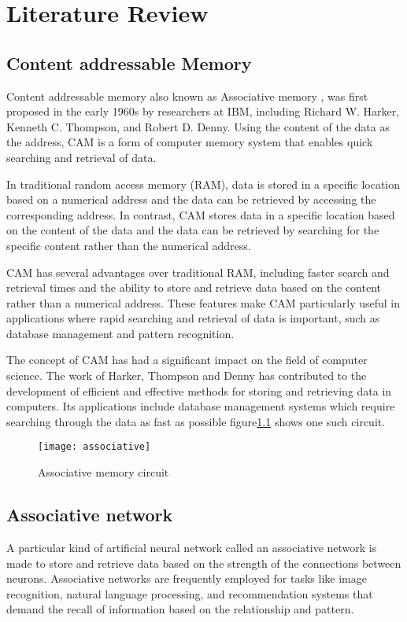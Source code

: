 \chapter{Literature Review}

\section{Content addressable Memory}
Content addressable memory also known as Associative memory , was first
proposed in the early 1960s by researchers at IBM, including Richard W. Harker,
Kenneth C. Thompson, and Robert D. Denny. Using the content of the data as the
address, CAM is a form of computer memory system that enables quick searching
and retrieval of data.

In traditional random access memory (RAM), data is stored in a specific
location based on a numerical address and the data can be retrieved by
accessing the corresponding address. In contrast, CAM stores data in a specific
location based on the content of the data and the data can be retrieved by
searching for the specific content rather than the numerical address.

CAM has several advantages over traditional RAM, including faster search and
retrieval times and the ability to store and retrieve data based on the content
rather than a numerical address. These features make CAM particularly useful in
applications where rapid searching and retrieval of data is important, such as
database management and pattern recognition.

The concept of CAM has had a significant impact on the field of computer
science. The work of Harker, Thompson and Denny has contributed to the
development of efficient and effective methods for storing and retrieving data
in computers. Its applications include database management systems which
require searching through the data as fast as possible
figure\ref{associative_circuit} shows one such circuit.
\begin{figure}[h!]
    \centering
    \texttt{[image: associative]}
    \caption{Associative memory circuit}\label{associative_circuit}
\end{figure}

\section{Associative network}
A particular kind of artificial neural network called an associative network is
made to store and retrieve data based on the strength of the connections
between neurons. Associative networks are frequently employed for tasks like
image recognition, natural language processing, and recommendation systems that
demand the recall of information based on the relationship and pattern.
